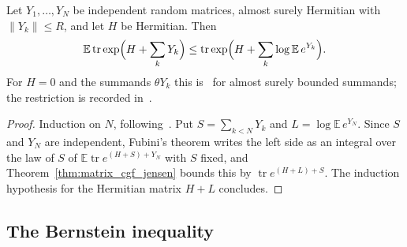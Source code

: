 \begin{theorem}
    \label{thm:matrix_cgf_subadditivity}
    \leanok
    Let $Y_1,\dots,Y_N$ be independent random matrices, almost surely Hermitian
    with $\|Y_k\|\le R$, and let $H$ be Hermitian. Then
    \begin{align}
        \label{eq:matrix_cgf_subadditivity}
        \mathbb{E}\operatorname{tr}\exp\Bigl(H+\sum_kY_k\Bigr)
        \le\operatorname{tr}\exp\Bigl(H+\sum_k\log\mathbb{E}\,e^{Y_k}\Bigr).
    \end{align}
    For $H=0$ and the summands $\theta Y_k$ this is~\cite[Lemma~3.4]{Tropp2012User}
    for almost surely bounded summands; the restriction is recorded
    in~\cite{gap:tropp12_bounded_summands_scope}.
\end{theorem}
\begin{proof}\leanok
    Induction on $N$, following~\cite[Lemma~3.4]{Tropp2012User}. Put
    $S=\sum_{k<N}Y_k$ and $L=\log\mathbb{E}\,e^{Y_N}$. Since $S$ and $Y_N$ are
    independent, Fubini's theorem writes the left side as an integral over the
    law of $S$ of $\mathbb{E}\operatorname{tr}e^{(H+S)+Y_N}$ with $S$ fixed, and
    Theorem~\ref{thm:matrix_cgf_jensen} bounds this by
    $\operatorname{tr}e^{(H+L)+S}$. The induction hypothesis for the Hermitian
    matrix $H+L$ concludes.
\end{proof}

\subsection{The Bernstein inequality}

